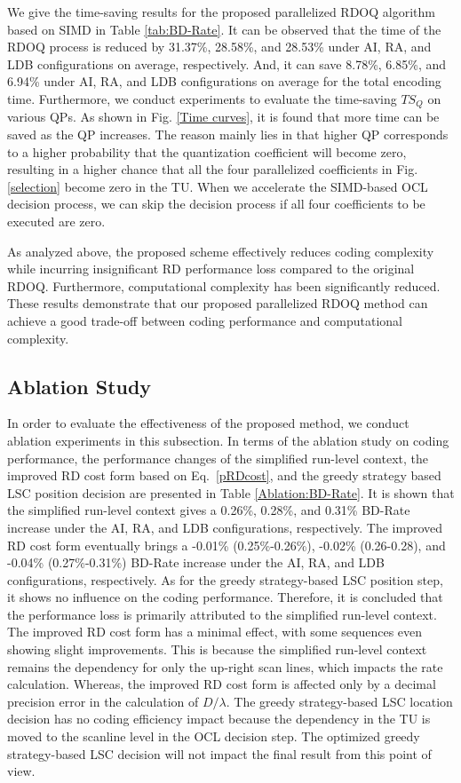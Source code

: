 \documentclass[lettersize,journal]{IEEEtran}
\begin{document}
We give the time-saving results for the proposed parallelized RDOQ algorithm based on SIMD in Table \ref{tab:BD-Rate}. It can be observed that the time of the RDOQ process is reduced by 31.37\%, 28.58\%, and 28.53\% under AI, RA, and LDB configurations on average, respectively. And, it can save 8.78\%, 6.85\%, and 6.94\% under AI, RA, and LDB configurations on average for the total encoding time. Furthermore, we conduct experiments to evaluate the time-saving $TS_{Q}$ on various QPs. As shown in Fig. \ref{Time curves}, it is found that more time can be saved as the QP increases. The reason mainly lies in that higher QP corresponds to a higher probability that the quantization coefficient will become zero, resulting in a higher chance that all the four parallelized coefficients in Fig. \ref{selection} become zero in the TU. When we accelerate the SIMD-based OCL decision process, we can skip the decision process if all four coefficients to be executed are zero. 

As analyzed above, the proposed scheme effectively reduces coding complexity while incurring insignificant RD performance loss compared to the original RDOQ. Furthermore, computational complexity has been significantly reduced. These results demonstrate that our proposed parallelized RDOQ method can achieve a good trade-off between coding performance and computational complexity. 

\subsection{Ablation Study}
In order to evaluate the effectiveness of the proposed method, we conduct ablation experiments in this subsection. In terms of the ablation study on coding performance, the performance changes of the simplified run-level context, the improved RD cost form based on Eq.~\eqref{pRDcost}, and the greedy strategy based LSC position decision are presented in Table \ref{Ablation:BD-Rate}. It is shown that the simplified run-level context gives a 0.26\%, 0.28\%, and 0.31\% BD-Rate increase under the AI, RA, and LDB configurations, respectively. The improved RD cost form eventually brings a -0.01\% (0.25\%-0.26\%), -0.02\% (0.26-0.28), and -0.04\% (0.27\%-0.31\%) BD-Rate increase under the AI, RA, and LDB configurations, respectively. As for the greedy strategy-based LSC position step, it shows no influence on the coding performance. Therefore, it is concluded that the performance loss is primarily attributed to the simplified run-level context. The improved RD cost form has a minimal effect, with some sequences even showing slight improvements. This is because the simplified run-level context remains the dependency for only the up-right scan lines, which impacts the rate calculation. Whereas, the improved RD cost form is affected only by a decimal precision error in the calculation of $D/\lambda$. The greedy strategy-based LSC location decision has no coding efficiency impact because the dependency in the TU is moved to the scanline level in the OCL decision step. The optimized greedy strategy-based LSC decision will not impact the final result from this point of view. 
\end{document}
